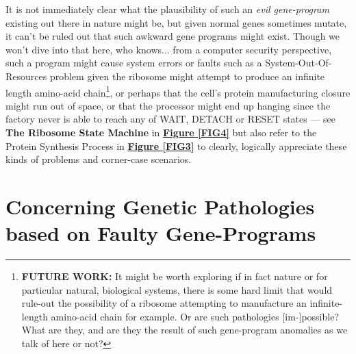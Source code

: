 \documentclass[a4paper, 18pt]{book} %
\begin{document}
It is not immediately clear what the plausibility of such an \textit{evil gene-program} existing out there in nature might be, but given normal genes sometimes mutate\cite{gregory1987oxford}, it can't be ruled out that such awkward gene programs might exist. Though we won't dive into that here, who knows... from a computer security perspective, such a program might cause system errors or faults such as a System-Out-Of-Resources problem given the ribosome might attempt to produce an infinite length amino-acid chain\footnote{\textbf{FUTURE WORK:} It might be worth exploring if in fact nature or for particular natural, biological systems, there is some hard limit that would rule-out the possibility of a ribosome attempting to manufacture an infinite-length amino-acid chain for example. Or are such pathologies [im-]possible? What are they, and are they the result of such gene-program anomalies as we talk of here or not?}, or perhaps that the cell's protein manufacturing closure might run out of space, or that the processor might end up hanging since the factory never is able to reach any of WAIT, DETACH or RESET states --- see \textbf{The Ribosome State Machine} in \textbf{\hyperref[FIG4]{Figure \ref{FIG4}}} but also refer to the Protein Synthesis Process in \textbf{\hyperref[FIG3]{Figure \ref{FIG3}}} to clearly, logically appreciate these kinds of problems and corner-case scenarios. 

\section{Concerning Genetic Pathologies based on Faulty Gene-Programs}
\end{document}
